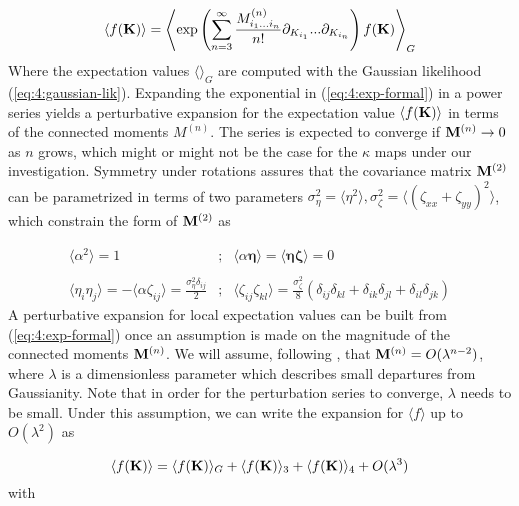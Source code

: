 \begin{equation}
\label{eq:4:exp-formal}
\langle f(\mathbf{K})\rangle = \left\langle\exp\left(\sum_{n=3}^\infty\frac{M^{(n)}_{i_1...i_n}}{n!}\partial_{K_{i_1}}...\partial_{K_{i_n}}\right)f(\mathbf{K})\right\rangle_G
\end{equation}
%
Where the expectation values $\langle\rangle_G$ are computed with the Gaussian likelihood (\ref{eq:4:gaussian-lik}). Expanding the exponential in (\ref{eq:4:exp-formal}) in a power series yields a perturbative expansion for the expectation value $\langle f(\mathbf{K})\rangle$ in terms of the connected moments $M^{(n)}$. The series is expected to converge if $\mathbf{M}^{(n)}\rightarrow 0$ as $n$ grows, which might or might not be the case for the $\kappa$ maps under our investigation. Symmetry under rotations assures that the covariance matrix $\mathbf{M}^{(2)}$ can be parametrized in terms of two parameters $\sigma^2_\eta=\langle\eta^2\rangle,\sigma^2_\zeta=\langle(\zeta_{xx}+\zeta_{yy})^2\rangle$, which constrain the form of $\mathbf{M}^{(2)}$ as 

\begin{equation}
\label{eq:4:cov-rotinv}
\begin{matrix}
\langle \alpha^2\rangle = 1 & ; & \langle \alpha \pmb{\eta} \rangle = \langle \pmb{\eta}\pmb{\zeta} \rangle = 0 \\ \\
\displaystyle \langle \eta_i\eta_j \rangle = -\langle \alpha \zeta_{ij} \rangle = \frac{\sigma_\eta^2 \delta_{ij}}{2} & ; & \displaystyle \langle \zeta_{ij}\zeta_{kl} \rangle = \frac{\sigma_\zeta^2}{8}(\delta_{ij}\delta_{kl}+\delta_{ik}\delta_{jl}+\delta_{il}\delta_{jk})
\end{matrix}
\end{equation}
%
A perturbative expansion for local expectation values can be built from (\ref{eq:4:exp-formal}) once an assumption is made on the magnitude of the connected moments $\mathbf{M}^{(n)}$. We will assume, following \citep{MatsubaraLong}, that $\mathbf{M}^{(n)}=O(\lambda^{n-2})$, where $\lambda$ is a dimensionless parameter which describes small departures from Gaussianity. Note that in order for the perturbation series to converge, $\lambda$ needs to be small. Under this assumption, we can write the expansion for $\langle f \rangle$ up to $O(\lambda^2)$ as 

\begin{equation}
\label{eq:4:pert-quad}
\langle f(\mathbf{K})\rangle = \langle f(\mathbf{K})\rangle_G + \langle f(\mathbf{K})\rangle_3 + \langle f(\mathbf{K})\rangle_4 + O(\lambda^3) 
\end{equation}
%
with 


